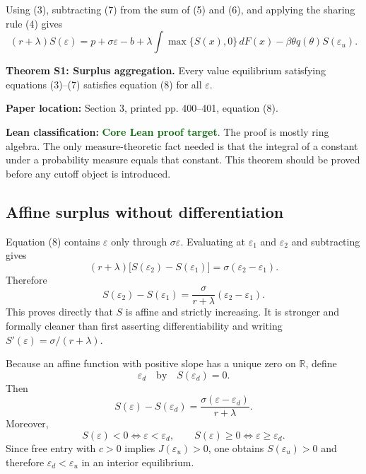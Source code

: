 \documentclass[11pt]{article}
\newcommand{\epsd}{\varepsilon_d}
\newcommand{\epsu}{\varepsilon_u}
\newcommand{\R}{\mathbb{R}}
\newcommand{\paperloc}[1]{\textbf{Paper location:} #1}
\newcommand{\leanclass}[1]{\textbf{Lean classification:} #1}
\newcommand{\core}{\textcolor{darkGreen}{\textbf{Core Lean proof target}}}
\newcommand{\resultname}[1]{\medskip\noindent\textbf{#1.}}
\begin{document}
Using (3), subtracting (7) from the sum of (5) and (6), and applying the sharing rule (4) gives
\begin{equation}
 (r+\lambda)S(\varepsilon)
 =p+\sigma\varepsilon-b
 +\lambda\int\max\{S(x),0\}\,dF(x)
 -\beta\theta q(\theta)S(\epsu). \tag{8}
\end{equation}

\resultname{Theorem S1: Surplus aggregation}
Every value equilibrium satisfying equations (3)--(7) satisfies equation (8) for all $\varepsilon$.

\paperloc{Section 3, printed pp. 400--401, equation (8).}

\leanclass{\core.}
The proof is mostly ring algebra. The only measure-theoretic fact needed is that the integral of a constant under a probability measure equals that constant. This theorem should be proved before any cutoff object is introduced.

\subsection{Affine surplus without differentiation}

Equation (8) contains $\varepsilon$ only through $\sigma\varepsilon$. Evaluating at $\varepsilon_1$ and $\varepsilon_2$ and subtracting gives
\begin{equation}
 (r+\lambda)\bigl[S(\varepsilon_2)-S(\varepsilon_1)\bigr]
 =\sigma(\varepsilon_2-\varepsilon_1). \tag{S2}
\end{equation}
Therefore
\begin{equation}
 S(\varepsilon_2)-S(\varepsilon_1)
 =\frac{\sigma}{r+\lambda}(\varepsilon_2-\varepsilon_1). \tag{S3}
\end{equation}
This proves directly that $S$ is affine and strictly increasing. It is stronger and formally cleaner than first asserting differentiability and writing $S'(\varepsilon)=\sigma/(r+\lambda)$.

Because an affine function with positive slope has a unique zero on $\R$, define
\[
 \epsd \quad\text{by}\quad S(\epsd)=0.
\]
Then
\begin{equation}
 S(\varepsilon)-S(\epsd)
 =\frac{\sigma(\varepsilon-\epsd)}{r+\lambda}. \tag{12}
\end{equation}
Moreover,
\[
 S(\varepsilon)<0\iff \varepsilon<\epsd,
 \qquad
 S(\varepsilon)\ge 0\iff \varepsilon\ge\epsd.
\]
Since free entry with $c>0$ implies $J(\epsu)>0$, one obtains $S(\epsu)>0$ and therefore $\epsd<\epsu$ in an interior equilibrium.
\end{document}
